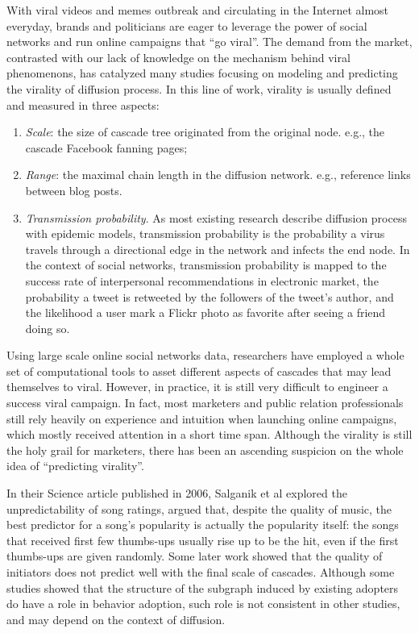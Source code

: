 \documentclass[phd,tocprelim]{cornell}
\begin{document}
With viral videos and memes outbreak and circulating in the Internet almost everyday, brands and politicians are eager to leverage the power of social networks and run online campaigns that ``go viral''. The demand from the market, contrasted with our lack of knowledge on the mechanism behind viral phenomenons, has catalyzed many studies focusing on modeling and predicting the virality of diffusion process. In this line of work, virality is usually defined and measured in three aspects: 
\begin{enumerate}
\item \emph{Scale}: the size of cascade tree originated from the original node.
e.g., the cascade Facebook fanning pages\cite{Sun-2009};
\item \emph{Range}: the maximal chain length in the diffusion network. e.g., reference links between blog posts\cite{Leskovec-SDM-07}. 
\item \emph{Transmission probability}. As most existing research describe diffusion process with epidemic models, transmission probability is the probability a virus travels through a directional edge in the network and infects the end node. In the context of social networks, transmission probability is mapped to  the success rate of interpersonal recommendations in electronic market\cite{Leskovec-EC-2006}, the probability a tweet is retweeted by the followers of the tweet's author\cite{Bakshy-2011}, and the likelihood a user mark a Flickr photo as favorite after seeing a friend doing so\cite{Cha-2009}.
\end{enumerate}

Using large scale online social networks data, researchers have employed a whole set of computational tools to asset different aspects of cascades that may lead themselves to viral. However, in practice, it is still very difficult to engineer a success viral campaign\cite{Bakshy-2011}. In fact, most marketers and public relation professionals still rely heavily on experience and intuition when launching online campaigns, which mostly received attention in a short time span\cite{Yang-2011,crane:2008,Wu-ICWSM-2011,Wu-Twitter-2011}. Although the virality is still the holy grail for marketers, there has been an ascending suspicion on the whole idea of ``predicting virality''.

In their Science article published in 2006, Salganik et al\cite{Salganik-2006} explored the unpredictability of song ratings, argued that, despite the quality of music, the best predictor for a song's popularity is actually the popularity itself: the songs that received first few thumbs-ups usually rise up to be the hit, even if the first thumbs-ups are given randomly. Some later work showed that the quality of initiators does not predict well with the final scale of cascades\cite{Sun-2009,Bakshy-2011}. Although some studies showed that the structure of the subgraph induced by existing adopters do have a role in behavior adoption\cite{Backstrom:2006,Romero-2011,Leskovec-SDM-07}, such role is not consistent in other studies\cite{Bakshy-2011}, and may depend on the context of diffusion\cite{Centola:2007}.
\end{document}
